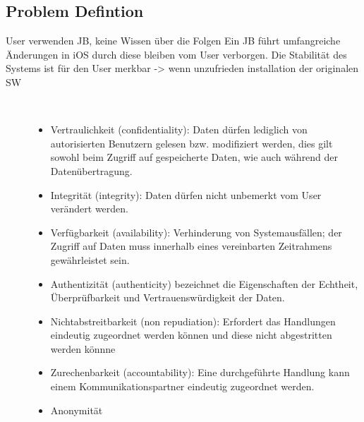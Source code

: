 \subsection{Problem Defintion}
\label{sec:IntroProblem}
User verwenden JB, keine Wissen über die Folgen
Ein JB führt umfangreiche Änderungen in iOS durch diese bleiben vom User verborgen.
Die Stabilität des Systems ist für den User merkbar -> wenn unzufrieden installation der originalen SW
\begin{description}
    \item[\parbox{\textwidth} {Aber Schutzziele Daten erhalten? }]~\par
    \begin{itemize}
       \item Vertraulichkeit (confidentiality): Daten dürfen lediglich von autorisierten Benutzern gelesen bzw. modifiziert werden, dies gilt sowohl beim Zugriff auf gespeicherte Daten, wie auch während der Datenübertragung.
       \item Integrität (integrity): Daten dürfen nicht unbemerkt vom User verändert werden.
      \item  Verfügbarkeit (availability): Verhinderung von Systemausfällen; der Zugriff auf Daten muss innerhalb eines vereinbarten Zeitrahmens gewährleistet sein.
       \item   Authentizität (authenticity) bezeichnet die Eigenschaften der Echtheit, Überprüfbarkeit und Vertrauenswürdigkeit der Daten.
       \item Nichtabstreitbarkeit (non repudiation): Erfordert das Handlungen eindeutig zugeordnet werden können und diese nicht abgestritten werden könnne
       \item  Zurechenbarkeit (accountability): Eine durchgeführte Handlung kann einem Kommunikationspartner eindeutig zugeordnet werden.
       \item Anonymität
    \end{itemize}
\end{description} 

               

